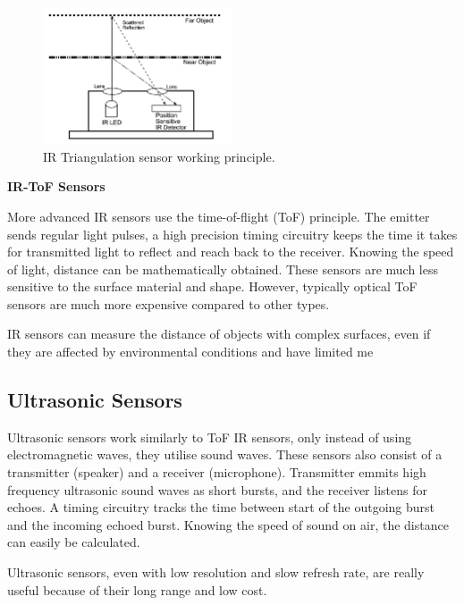 \documentclass[12pt, a4paper]{article}
\begin{document}
                \begin{figure}[H]\centering
                    \includegraphics[width=0.5\textwidth]{triangulation}
                    \caption[]{IR Triangulation sensor working principle.\cite{triangulation}}\label{fig:triangulation}
                \end{figure}
            
            \bigskip\noindent
            \textbf{IR-ToF Sensors}

                More advanced IR sensors use the time-of-flight (ToF) principle. The emitter sends regular light pulses, a high precision timing circuitry keeps the time it takes for transmitted light to reflect and reach back to the receiver. Knowing the speed of light, distance can be mathematically obtained. These sensors are much less sensitive to the surface material and shape. However, typically optical ToF sensors are much more expensive compared to other types.

            IR sensors can measure the distance of objects with complex surfaces, even if they are affected by environmental conditions and have limited me

                
        
        \subsection{Ultrasonic Sensors}
            Ultrasonic sensors work similarly to ToF IR sensors, only instead of using electromagnetic waves, they utilise sound waves. These sensors also consist of a transmitter (speaker) and a receiver (microphone). Transmitter emmits high frequency ultrasonic sound waves as short bursts, and the receiver listens for echoes. A timing circuitry tracks the time between start of the outgoing burst and the incoming echoed burst. Knowing the speed of sound on air, the distance can easily be calculated.

            Ultrasonic sensors, even with low resolution and slow refresh rate, are really useful because of their long range and low cost.
\end{document}
